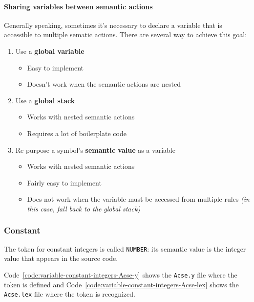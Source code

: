 \documentclass[english]{article}
\begin{document}
\paragraph{Sharing variables between semantic actions}

Generally speaking, sometimes it's necessary to declare a variable that is accessible to multiple sematic actions.
There are several way to achieve this goal:

\begin{enumerate}
  \item Use a \textbf{global variable}
        \begin{itemize}
          \item[\cmarkthin] Easy to implement
          \item[\xmarkthin] Doesn't work when the semantic actions are nested
        \end{itemize}
  \item Use a \textbf{global stack}
        \begin{itemize}
          \item[\cmarkthin] Works with nested semantic actions
          \item[\xmarkthin] Requires a lot of boilerplate code
        \end{itemize}
  \item Re purpose a symbol's \textbf{semantic value} as a variable
        \begin{itemize}
          \item[\cmarkthin] Works with nested semantic actions
          \item[\cmarkthin] Fairly easy to implement
          \item[\xmarkthin] Does not work when the variable must be accessed from multiple rules \textit{(in this case, fall back to the global stack)}
        \end{itemize}
\end{enumerate}

\subsubsection{Constant}

The token for constant integers is called \texttt{NUMBER}:
its semantic value is the integer value that appears in the \lance source code.

Code~\ref{code:variable-constant-integers-Acse-y} shows the \texttt{Acse.y} file where the token is defined and Code~\ref{code:variable-constant-integers-Acse-lex} shows the \texttt{Acse.lex} file where the token is recognized.
\end{document}

